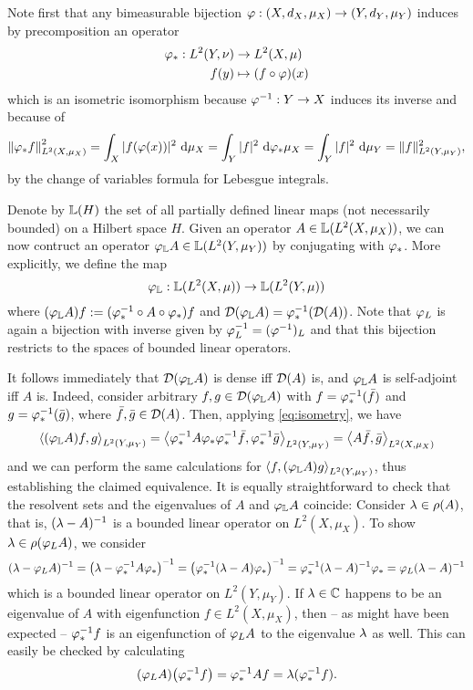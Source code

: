 Note first that any bimeasurable bijection $\varphi:(X,d_X,\mu_X)\to(Y,d_Y,\mu_Y)$ induces by precomposition an operator
\begin{align*}
  \varphi_*:L^2(Y,\nu)&\to L^2(X,\mu)\\
  f(y)&\mapsto(f\circ\varphi)(x)
\end{align*}
which is an isometric isomorphism because $\varphi^{-1}:Y\to X$ induces its inverse and because of
\begin{equation}\label{eq:isometry}
  \left\|\varphi_*f\right\|_{L^2(X,\mu_X)}^2
  =\int_X |f(\varphi(x))|^2\,\operatorname{d}\!\mu_X
  =\int_Y |f|^2\,\operatorname{d}\!\varphi_*\mu_X
  =\int_Y |f|^2\,\operatorname{d}\!\mu_Y
  =\|f\|_{L^2(Y,\mu_Y)}^2,
\end{equation}
by the change of variables formula for Lebesgue integrals. 

Denote by $\mathbb{L}(H)$ the set of all partially defined linear maps (not necessarily bounded) on a Hilbert space $H$. Given an operator $A\in\mathbb{L}(L^2(X,\mu_X))$, we can now contruct an operator $\varphi_{\mathbb{L}} A\in\mathbb{L}(L^2(Y,\mu_Y))$ by conjugating with $\varphi_*$. More explicitly, we define the map
\[
  \varphi_{\mathbb{L}}:\mathbb{L}(L^2(X,\mu))\to\mathbb{L}(L^2(Y,\mu))
\]
where $(\varphi_{\mathbb{L}} A)f:=(\varphi_*^{-1}\circ A\circ\varphi_*)f$ and $\mathcal{D}(\varphi_{\mathbb{L}} A)=\varphi_*^{-1}(\mathcal{D}(A))$. Note that $\varphi_L$ is again a bijection with inverse given by $\varphi_L^{-1}=(\varphi^{-1})_L$ and that this bijection restricts to the spaces of bounded linear operators. 

It follows immediately that $\mathcal{D}(\varphi_{\mathbb{L}} A)$ is dense iff $\mathcal{D}(A)$ is, and $\varphi_{\mathbb{L}} A$ is self-adjoint iff $A$ is. Indeed, consider arbitrary $f,g\in\mathcal{D}(\varphi_{\mathbb{L}} A)$ with $f=\varphi_*^{-1}(\bar f)$ and $g=\varphi_*^{-1}(\bar g)$, where $\bar f, \bar g\in \mathcal{D}(A)$. Then, applying \eqref{eq:isometry}, we have
\[
  \left<(\varphi_{\mathbb{L}} A)f,g\right>_{L^2(Y,\mu_Y)}
  =\left<\varphi_*^{-1}A\varphi_*\varphi_*^{-1}\bar f,\varphi_*^{-1}\bar g\right>_{L^2(Y,\mu_Y)}
  =\left<A\bar f,\bar g\right>_{L^2(X,\mu_X)}
\]
and we can perform the same calculations for $\left<f,(\varphi_{\mathbb{L}} A)g\right>_{L^2(Y,\mu_Y)}$, thus establishing the claimed equivalence. It is equally straightforward to check that the resolvent sets and the eigenvalues of $A$ and $\varphi_{\mathbb{L}} A$ coincide: Consider $\lambda\in\rho(A)$, that is, 
$(\lambda-A)^{-1}$ is a bounded linear operator on $L^2(X,\mu_X)$. To show $\lambda\in\rho(\varphi_L A)$, we consider
\[
  (\lambda-\varphi_L A)^{-1}
  =\left(\lambda-\varphi_*^{-1}A\varphi_*\right)^{-1}
  =\left(\varphi_*^{-1}(\lambda-A)\varphi_*\right)^{-1}
  =\varphi_*^{-1}(\lambda-A)^{-1}\varphi_*
  =\varphi_L(\lambda-A)^{-1}
\]
which is a bounded linear operator on $L^2(Y,\mu_Y)$. If $\lambda\in\mathbb{C}$ happens to be an eigenvalue of $A$ with eigenfunction $f\in L^2(X,\mu_X)$, then -- as might have been expected -- $\varphi_*^{-1}f$ is an eigenfunction of 
$\varphi_L A$ to the eigenvalue $\lambda$ as well. This can easily be checked by calculating
\[
  (\varphi_L A)\big(\varphi_*^{-1}f\big)=\varphi_*^{-1}Af=\lambda(\varphi_*^{-1}f).
\]



